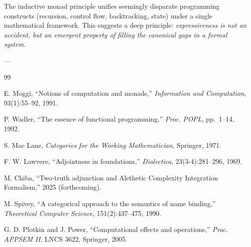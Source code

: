 \documentclass[a4paper,11pt]{article}
\theoremstyle{definition}
\begin{document}
The inductive monad principle unifies seemingly disparate programming constructs (recursion, control flow, backtracking, state) under a single mathematical framework. This suggests a deep principle: \emph{expressiveness is not an accident, but an emergent property of filling the canonical gaps in a formal system}.

---

\begin{thebibliography}{99}

 E. Moggi, ``Notions of computation and monads,'' \emph{Information and Computation}, 93(1):55--92, 1991.

 P. Wadler, ``The essence of functional programming,'' \emph{Proc. POPL}, pp.~1--14, 1992.

 S. Mac Lane, \emph{Categories for the Working Mathematician}, Springer, 1971.

 F. W. Lawvere, ``Adjointness in foundations,'' \emph{Dialectica}, 23(3-4):281--296, 1969.

 M. Chiba, ``Two-truth adjunction and Alethetic Complexity Integration Formalism,'' 2025 (forthcoming).

 M. Spivey, ``A categorical approach to the semantics of name binding,'' \emph{Theoretical Computer Science}, 151(2):437--475, 1990.

 G. D. Plotkin and J. Power, ``Computational effects and operations,'' \emph{Proc. APPSEM II}, LNCS 3622, Springer, 2005.

\end{thebibliography}
\end{document}
